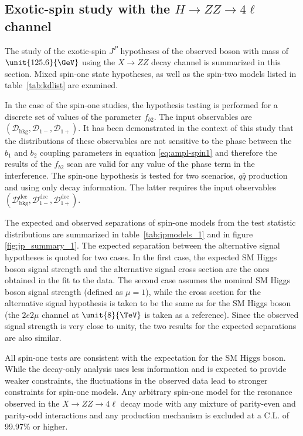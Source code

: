 \subsection{Exotic-spin study with the \texorpdfstring{$H \to ZZ \to 4\ell$}{H to ZZ to 4l} channel}
\label{sec:ResultsExotic}

The study of the exotic-spin $J^P$ hypotheses of the observed boson with mass of $\unit{125.6}{\GeV}$ using the $X \to ZZ$ decay channel is summarized in this section. Mixed spin-one state hypotheses, as well as the spin-two models listed in table~\ref{tab:kdlist} are examined.

In the case of the spin-one studies, the hypothesis testing is performed for a discrete set of values of the parameter $f_{b2}$. The input observables are $\left(\mathcal{D}_\text{bkg}, \mathcal{D}_{1-}, \mathcal{D}_{1+}\right)$. It has been demonstrated in the context of this study that the distributions of these observables are not sensitive to the phase between the $b_1$ and $b_2$ coupling parameters in equation \eqref{eq:ampl-spin1} and therefore the results of the $f_{b2}$ scan are valid for any value of the phase term in the interference. The spin-one hypothesis is tested for
two scenarios, $q\bar{q}$ production and using only decay information. The latter requires the input observables $\left(\mathcal{D}_\text{bkg}^\text{dec},\mathcal{D}_{1-}^\text{dec},\mathcal{D}_{1+}^\text{dec}\right)$.

The expected and observed separations of spin-one models from the test statistic distributions
are summarized in table~\ref{tab:jpmodels_1} and in figure \ref{fig:jp_summary_1}.
The expected separation between the alternative signal hypotheses is
quoted for two cases. In the first case, the expected SM Higgs boson
signal strength and the alternative signal cross section are
the ones obtained in the fit to the data.
The second case assumes the nominal SM Higgs boson signal strength
(defined as $\mu=1$), while the cross section for the alternative signal hypothesis is
taken to be the same as for the SM Higgs boson (the $2e2\mu$
channel at $\unit{8}{\TeV}$ is taken as a reference). Since the observed signal strength
is very close to unity, the two results for the expected separations are also similar.

All spin-one tests are consistent with the expectation for the SM Higgs boson.
While the decay-only analysis uses less information and is expected to provide weaker constraints,
the fluctuations in the observed data lead to stronger constraints for spin-one models. Any arbitrary spin-one model for the resonance observed in the $X \to ZZ\to 4\ell$ decay mode with any
mixture of parity-even and parity-odd interactions and any production mechanism is excluded at a C.L. of
99.97\% or higher.

